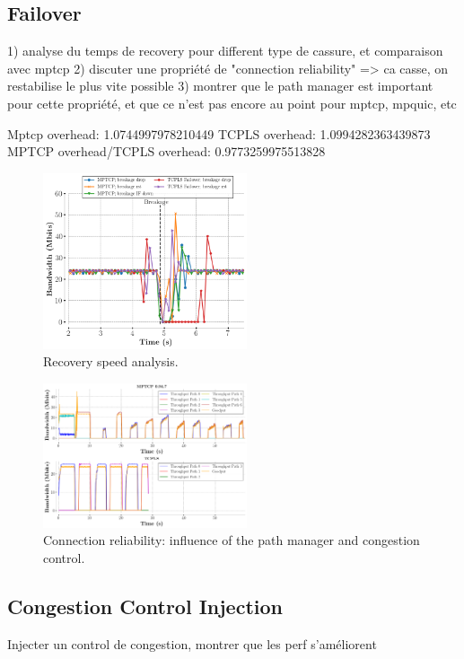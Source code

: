 \subsection{Failover}

1) analyse du temps de recovery pour different type de cassure, et comparaison avec mptcp
2) discuter une propriété de "connection reliability" => ca casse, on restabilise le plus vite possible
3) montrer que le path manager est important pour cette propriété, et que ce n'est pas encore au point pour mptcp, mpquic, etc

Mptcp overhead: 1.0744997978210449
TCPLS overhead: 1.0994282363439873
MPTCP overhead/TCPLS overhead:              0.9773259975513828


\begin{figure}[!t]
  \begin{center}
    \includegraphics[width=6cm]{figures/breakage_analysis.png}
  \end{center}
  \caption{Recovery speed analysis.}
\end{figure}


\begin{figure}[!t]
  \begin{center}
    \includegraphics[width=6cm]{figures/tcpls_mptcp.png}
  \end{center}
  \caption{Connection reliability: influence of the path manager and congestion
  control.}
\end{figure}



\subsection{Congestion Control Injection}

Injecter un control de congestion, montrer que les perf s'améliorent
